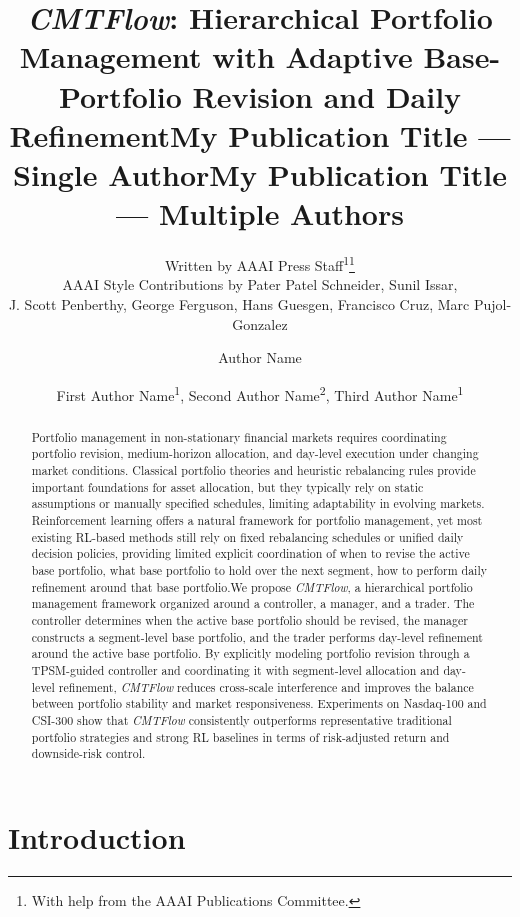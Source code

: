 \documentclass[letterpaper]{article} %
\title{\textit{CMTFlow}: Hierarchical Portfolio Management with Adaptive Base-Portfolio Revision and Daily Refinement}
\author{
    Written by AAAI Press Staff\textsuperscript{\rm 1}\thanks{With help from the AAAI Publications Committee.}\\
    AAAI Style Contributions by Pater Patel Schneider,
    Sunil Issar,\\
    J. Scott Penberthy,
    George Ferguson,
    Hans Guesgen,
    Francisco Cruz\equalcontrib,
    Marc Pujol-Gonzalez\equalcontrib
}
\title{My Publication Title --- Single Author}
\author {
    Author Name
}
\title{My Publication Title --- Multiple Authors}
\author {
    First Author Name\textsuperscript{\rm 1},
    Second Author Name\textsuperscript{\rm 2},
    Third Author Name\textsuperscript{\rm 1}
}
\begin{document}
\maketitle

\begin{abstract}
Portfolio management in non-stationary financial markets requires coordinating portfolio revision, medium-horizon allocation, and day-level execution under changing market conditions. Classical portfolio theories and heuristic rebalancing rules provide important foundations for asset allocation, but they typically rely on static assumptions or manually specified schedules, limiting adaptability in evolving markets. Reinforcement learning offers a natural framework for portfolio management, yet most existing RL-based methods still rely on fixed rebalancing schedules or unified daily decision policies, providing limited explicit coordination of when to revise the active base portfolio, what base portfolio to hold over the next segment, how to perform daily refinement around that base portfolio.We propose \textit{CMTFlow}, a hierarchical portfolio management framework organized around a controller, a manager, and a trader. The controller determines when the active base portfolio should be revised, the manager constructs a segment-level base portfolio, and the trader performs day-level refinement around the active base portfolio. By explicitly modeling portfolio revision through a TPSM-guided controller and coordinating it with segment-level allocation and day-level refinement, \textit{CMTFlow} reduces cross-scale interference and improves the balance between portfolio stability and market responsiveness. Experiments on Nasdaq-100 and CSI-300 show that \textit{CMTFlow} consistently outperforms representative traditional portfolio strategies and strong RL baselines in terms of risk-adjusted return and downside-risk control.
\end{abstract}

\section{Introduction}
\end{document}
